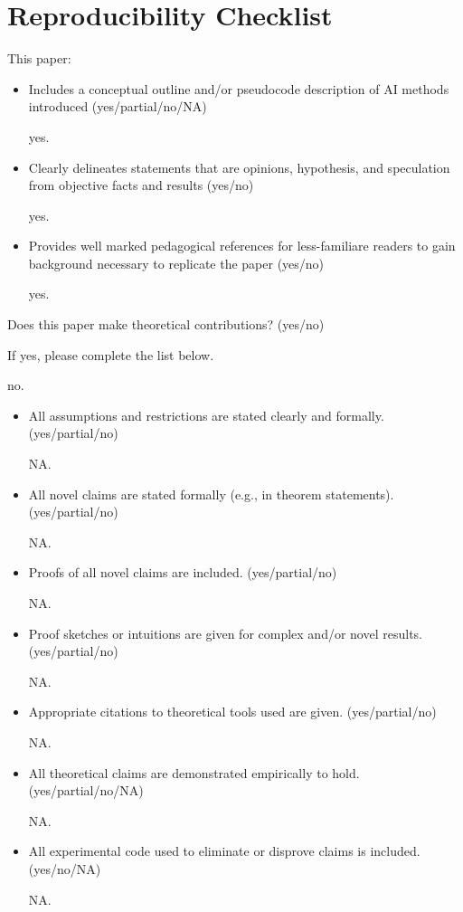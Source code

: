 \section*{Reproducibility Checklist}


This paper:

\begin{itemize}
\item Includes a conceptual outline and/or pseudocode description of AI methods introduced (yes/partial/no/NA)

yes.

\item Clearly delineates statements that are opinions, hypothesis, and speculation from objective facts and results (yes/no)

yes.

\item Provides well marked pedagogical references for less-familiare readers to gain background necessary to replicate the paper (yes/no)

yes.

\end{itemize}

\noindent Does this paper make theoretical contributions? (yes/no)

\noindent If yes, please complete the list below.

no.

\begin{itemize}
\item All assumptions and restrictions are stated clearly and formally. (yes/partial/no)

NA.

\item All novel claims are stated formally (e.g., in theorem statements). (yes/partial/no)

NA.

\item Proofs of all novel claims are included. (yes/partial/no)

NA.

\item Proof sketches or intuitions are given for complex and/or novel results. (yes/partial/no)

NA.

\item Appropriate citations to theoretical tools used are given. (yes/partial/no)

NA.

\item All theoretical claims are demonstrated empirically to hold. (yes/partial/no/NA)

NA.

\item All experimental code used to eliminate or disprove claims is included. (yes/no/NA)

NA.

\end{itemize}

